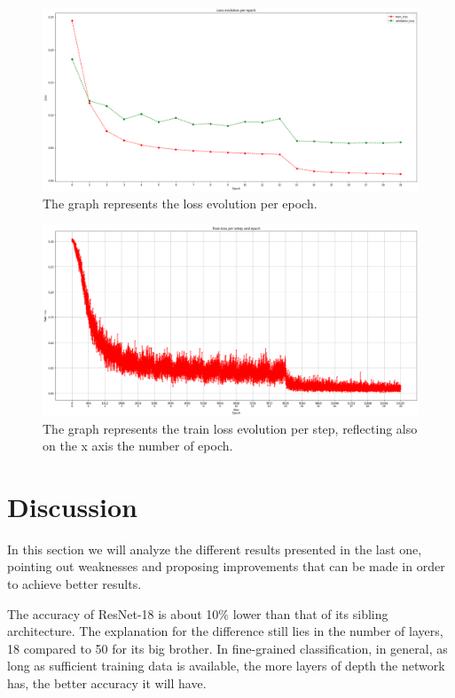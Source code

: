 \documentclass{article}
\begin{document}
\begin{figure}[h]
    \centering
    \includegraphics[width=13cm]{loss50}
    \caption{The graph represents the loss evolution per epoch.}
    \label{fig:loss50}

\end{figure}

\begin{figure}[h]
    \centering
    \includegraphics[width=13cm]{losstep}
    \caption{The graph represents the train loss evolution per step, reflecting also on the x axis the number of epoch.}
    \label{fig:losstep}

\end{figure}

\section{Discussion}

In this section we will analyze the different results presented in the last one, pointing out weaknesses and proposing improvements that can be made in order to achieve better results.

The accuracy of ResNet-18 is about 10\% lower than that of its sibling architecture. The explanation for the difference still lies in the number of layers, 18 compared to 50 for its big brother.  In fine-grained classification, in general, as long as sufficient training data is available, the more layers of depth the network has, the better accuracy it will have.
\end{document}
